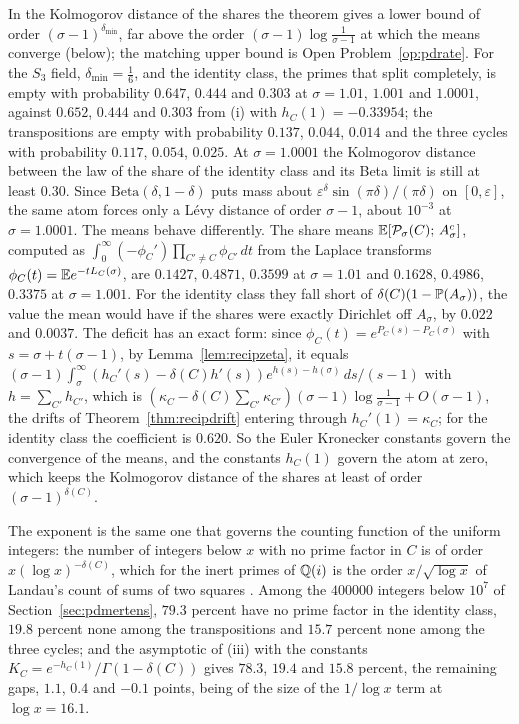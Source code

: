 In the Kolmogorov distance of the shares the theorem gives a lower bound of order $(\sigma-1)^{\delta_{\min}}$, far above the order $(\sigma-1)\log\frac1{\sigma-1}$ at which the means converge (below); the matching upper bound is Open Problem~\ref{op:pdrate}. For the $S_3$ field, $\delta_{\min}=\frac16$, and the identity class, the primes that split completely, is empty with probability $0.647$, $0.444$ and $0.303$ at $\sigma=1.01$, $1.001$ and $1.0001$, against $0.652$, $0.444$ and $0.303$ from (i) with $h_C(1)=-0.33954$; the transpositions are empty with probability $0.137$, $0.044$, $0.014$ and the three cycles with probability $0.117$, $0.054$, $0.025$. At $\sigma=1.0001$ the Kolmogorov distance between the law of the share of the identity class and its Beta limit is still at least $0.30$. Since $\mathrm{Beta}(\delta,1-\delta)$ puts mass about $\varepsilon^\delta\sin(\pi\delta)/(\pi\delta)$ on $[0,\varepsilon]$, the same atom forces only a L\'evy distance of order $\sigma-1$, about $10^{-3}$ at $\sigma=1.0001$. The means behave differently. The share means $\mathbb{E}[\mathcal P_\sigma(C);\,A_\sigma^c]$, computed as $\int_0^\infty(-\phi_C')\prod_{C'\ne C}\phi_{C'}\,dt$ from the Laplace transforms $\phi_C(t)=\mathbb{E} e^{-tL_C(\sigma)}$, are $0.1427$, $0.4871$, $0.3599$ at $\sigma=1.01$ and $0.1628$, $0.4986$, $0.3375$ at $\sigma=1.001$. For the identity class they fall short of $\delta(C)(1-\mathbb{P}(A_\sigma))$, the value the mean would have if the shares were exactly Dirichlet off $A_\sigma$, by $0.022$ and $0.0037$. The deficit has an exact form: since $\phi_C(t)=e^{P_C(s)-P_C(\sigma)}$ with $s=\sigma+t(\sigma-1)$, by Lemma~\ref{lem:recipzeta}, it equals $(\sigma-1)\int_\sigma^\infty(h_C'(s)-\delta(C)h'(s))e^{h(s)-h(\sigma)}\,ds/(s-1)$ with $h=\sum_{C'}h_{C'}$, which is $(\kappa_C-\delta(C)\sum_{C'}\kappa_{C'})(\sigma-1)\log\frac1{\sigma-1}+O(\sigma-1)$, the drifts of Theorem~\ref{thm:recipdrift} entering through $h_C'(1)=\kappa_C$; for the identity class the coefficient is $0.620$. So the Euler Kronecker constants govern the convergence of the means, and the constants $h_C(1)$ govern the atom at zero, which keeps the Kolmogorov distance of the shares at least of order $(\sigma-1)^{\delta(C)}$.

The exponent is the same one that governs the counting function of the uniform integers: the number of integers below $x$ with no prime factor in $C$ is of order $x(\log x)^{-\delta(C)}$, which for the inert primes of $\mathbb{Q}(i)$ is the order $x/\sqrt{\log x}$ of Landau's count of sums of two squares \cite{landau1908}. Among the $400000$ integers below $10^7$ of Section~\ref{sec:pdmertens}, $79.3$ percent have no prime factor in the identity class, $19.8$ percent none among the transpositions and $15.7$ percent none among the three cycles; and the asymptotic of (iii) with the constants $K_C=e^{-h_C(1)}/\Gamma(1-\delta(C))$ gives $78.3$, $19.4$ and $15.8$ percent, the remaining gaps, $1.1$, $0.4$ and $-0.1$ points, being of the size of the $1/\log x$ term at $\log x=16.1$.

